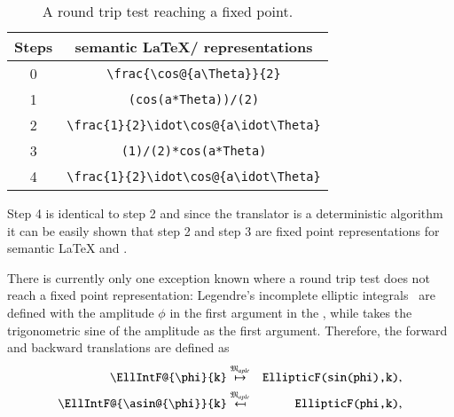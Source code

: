 \begin{table}[ht]
\centering
\begin{tabular}{cc}
	\hline 
	Steps & semantic \LaTeX{}/\Maple{} representations\\
	\hline
	\rule{0pt}{0.9\normalbaselineskip}0 & \verb|\frac{\cos@{a\Theta}}{2}|\\
	1 & \verb|(cos(a*Theta))/(2)| \\
	2 & \verb|\frac{1}{2}\idot\cos@{a\idot\Theta}| \\
	3 & \verb|(1)/(2)*cos(a*Theta)|\\
	4 & \verb|\frac{1}{2}\idot\cos@{a\idot\Theta}| \\
	\hline
\end{tabular}
\caption{A round trip test reaching a fixed point.}
\label{tab:fixpoint}
\end{table}

Step 4 is identical to step 2 and since the translator is a deterministic algorithm it can be easily shown that step 2 and step 3 are fixed point representations for semantic \LaTeX{} and \Maple.


There is currently only one exception known where a round trip test does not reach a fixed point representation: Legendre's incomplete elliptic integrals~\parencite[eq. 19.2.4-7]{NIST:DLMF} are defined with the amplitude $\phi$ in the first argument in the \DLMF, while \Maple{} takes the trigonometric sine of the amplitude as the first argument. Therefore, the forward and backward translations are defined as
\begin{eqnarray}
\verb|\EllIntF@{\phi}{k}| & \overset{\langMaple}{\mapsto} & \verb|EllipticF(sin(phi),k)|,\\
\verb|\EllIntF@{\asin@{\phi}}{k}| & \overset{\langMaple}{\mapsfrom} & \verb|EllipticF(phi,k)|,
\end{eqnarray}

